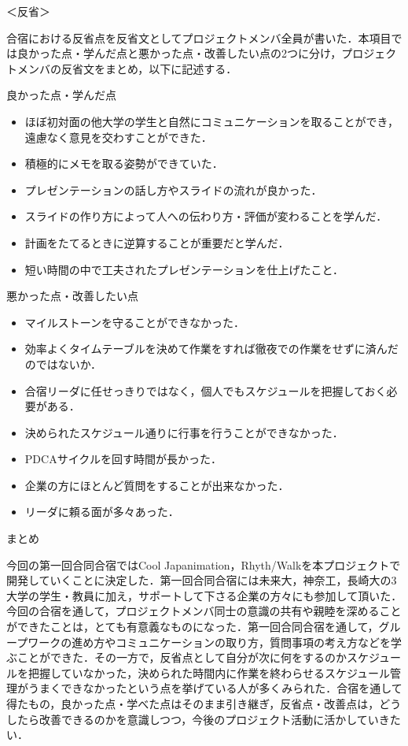 \par
＜反省＞
\par
合宿における反省点を反省文としてプロジェクトメンバ全員が書いた．本項目では良かった点・学んだ点と悪かった点・改善したい点の2つに分け，プロジェクトメンバの反省文をまとめ，以下に記述する．
\par
良かった点・学んだ点
\begin{itemize}
\item ほぼ初対面の他大学の学生と自然にコミュニケーションを取ることができ，遠慮なく意見を交わすことができた．
\item 積極的にメモを取る姿勢ができていた．
\item プレゼンテーションの話し方やスライドの流れが良かった．
\item スライドの作り方によって人への伝わり方・評価が変わることを学んだ．
\item 計画をたてるときに逆算することが重要だと学んだ．
\item 短い時間の中で工夫されたプレゼンテーションを仕上げたこと．
\end{itemize}
\par
悪かった点・改善したい点
\begin{itemize}
\item マイルストーンを守ることができなかった．
\item 効率よくタイムテーブルを決めて作業をすれば徹夜での作業をせずに済んだのではないか．
\item 合宿リーダに任せっきりではなく，個人でもスケジュールを把握しておく必要がある．
\item 決められたスケジュール通りに行事を行うことができなかった．
\item PDCAサイクルを回す時間が長かった．
\item 企業の方にほとんど質問をすることが出来なかった．
\item リーダに頼る面が多々あった．
\end{itemize}
\par
まとめ
\par
今回の第一回合同合宿ではCool Japanimation，Rhyth/Walkを本プロジェクトで開発していくことに決定した．第一回合同合宿には未来大，神奈工，長崎大の3大学の学生・教員に加え，サポートして下さる企業の方々にも参加して頂いた．今回の合宿を通して，プロジェクトメンバ同士の意識の共有や親睦を深めることができたことは，とても有意義なものになった．第一回合同合宿を通して，グループワークの進め方やコミュニケーションの取り方，質問事項の考え方などを学ぶことができた．その一方で，反省点として自分が次に何をするのかスケジュールを把握していなかった，決められた時間内に作業を終わらせるスケジュール管理がうまくできなかったという点を挙げている人が多くみられた．合宿を通して得たもの，良かった点・学べた点はそのまま引き継ぎ，反省点・改善点は，どうしたら改善できるのかを意識しつつ，今後のプロジェクト活動に活かしていきたい．
